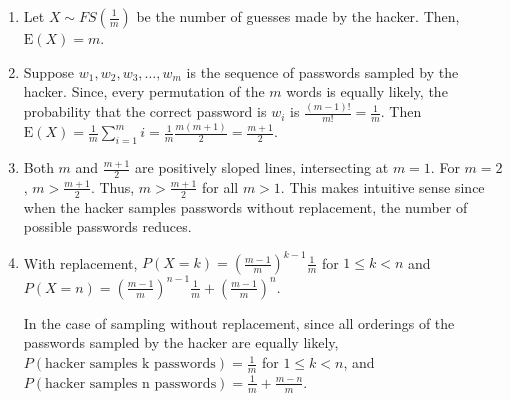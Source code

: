 \begin{enumerate}[label=(\alph*)]
\item Let $X \sim FS(\frac{1}{m})$ be the number of guesses made by the hacker.
Then, $\text{E}(X) = m$.

\item Suppose $w_{1}, w_{2}, w_{3}, \dots, w_{m}$ is the sequence of passwords
sampled by the hacker. Since, every permutation of the $m$ words is equally
likely, the probability that the correct password is $w_{i}$ is $\frac{(m-1)!}
{m!} = \frac{1}{m}$. Then $\text{E}(X) = \frac{1}{m}\sum_{i=1}^{m}i = \frac{1}
{m}\frac{m(m+1)}{2} = \frac{m+1}{2}$.

\item Both $m$ and $\frac{m+1}{2}$ are positively sloped lines, intersecting at
$m=1$. For $m=2$, $m > \frac{m+1}{2}$. Thus, $m > \frac{m+1}{2}$ for all $m >
1$. This makes intuitive sense since when the hacker samples passwords without
replacement, the number of possible passwords reduces.

\item With replacement, $P(X = k) = (\frac{m-1}{m})^{k-1}\frac{1}{m}$ for $1
\leq k < n$ and $P(X=n) = (\frac{m-1}{m})^{n-1}\frac{1}{m} + (\frac{m-1}{m})^
{n}$.

In the case of sampling without replacement, since all orderings of the passwords
sampled by the hacker are equally likely, $P(\text{hacker samples k passwords})
= \frac{1}{m}$ for $1 \leq k < n$, and $P(\text{hacker samples n passwords}) =
\frac{1}{m} + \frac{m-n}{m}$.
\end{enumerate}